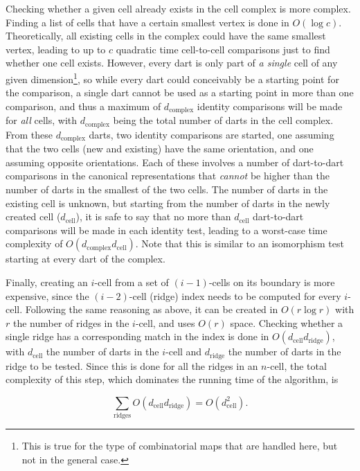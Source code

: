 Checking whether a given cell already exists in the cell complex is more complex.
Finding a list of cells that have a certain smallest vertex is done in $O(\log c)$.
Theoretically, all existing cells in the complex could have the same smallest vertex, leading to up to $c$ quadratic time cell-to-cell comparisons just to find whether one cell exists.
However, every dart is only part of \emph{a single} cell of any given dimension\footnote{This is true for the type of combinatorial maps that are handled here, but not in the general case.}, so while every dart could conceivably be a starting point for the comparison, a single dart cannot be used as a starting point in more than one comparison, and thus a maximum of $d_{\mathrm{complex}}$ identity comparisons will be made for \emph{all} cells, with $d_{\mathrm{complex}}$ being the total number of darts in the cell complex.
From these $d_{\mathrm{complex}}$ darts, two identity comparisons are started, one assuming that the two cells (new and existing) have the same orientation, and one assuming opposite orientations.
Each of these involves a number of dart-to-dart comparisons in the canonical representations that \emph{cannot} be higher than the number of darts in the smallest of the two cells.
The number of darts in the existing cell is unknown, but starting from the number of darts in the newly created cell ($d_{\mathrm{cell}}$), it is safe to say that no more than $d_{\mathrm{cell}}$ dart-to-dart comparisons will be made in each identity test, leading to a worst-case time complexity of $O(d_{\mathrm{complex}} d_{\mathrm{cell}})$.
Note that this is similar to an isomorphism test starting at every dart of the complex.

Finally, creating an $i$-cell from a set of $(i-1)$-cells on its boundary is more expensive, since the $(i-2)$-cell (ridge) index needs to be computed for every $i$-cell.
Following the same reasoning as above, it can be created in $O(r \log r)$ with $r$ the number of ridges in the $i$-cell, and uses $O(r)$ space.
Checking whether a single ridge has a corresponding match in the index is done in $O(d_{\mathrm{cell}} d_{\mathrm{ridge}})$, with $d_{\mathrm{cell}}$ the number of darts in the $i$-cell and $d_{\mathrm{ridge}}$ the number of darts in the ridge to be tested.
Since this is done for all the ridges in an $n$-cell, the total complexity of this step, which dominates the running time of the algorithm, is

\begin{equation*}
\displaystyle\sum_{\mathrm{ridges}} O(d_{\mathrm{cell}} d_{\mathrm{ridge}}) = O(d_{\mathrm{cell}}^{2}).
\end{equation*}

